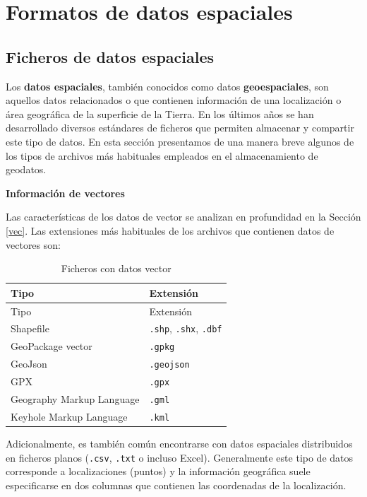 \documentclass[
]{book}
\theoremstyle{definition}
\theoremstyle{definition}
\theoremstyle{definition}
\theoremstyle{definition}
\theoremstyle{remark}
\begin{document}
\hypertarget{formatos}{%
\chapter{Formatos de datos espaciales}\label{formatos}}

\hypertarget{ficheros-de-datos-espaciales}{%
\section{Ficheros de datos espaciales}\label{ficheros-de-datos-espaciales}}

Los \textbf{datos espaciales}, también conocidos como datos \textbf{geoespaciales}, son
aquellos datos relacionados o que contienen información de una localización o
área geográfica de la superficie de la Tierra. En los últimos años se han
desarrollado diversos estándares de ficheros que permiten almacenar y compartir
este tipo de datos. En esta sección presentamos de una manera breve algunos de
los tipos de archivos más habituales empleados en el almacenamiento de geodatos.

\textbf{Información de vectores}

Las características de los datos de vector se analizan en profundidad en la
Sección \ref{vec}. Las extensiones más habituales de los archivos que contienen
datos de vectores son:

\begin{longtable}[]{@{}ll@{}}
\caption{Ficheros con datos vector}\tabularnewline
\toprule
Tipo & Extensión \\
\midrule
\endfirsthead
\toprule
Tipo & Extensión \\
\midrule
\endhead
Shapefile & \texttt{.shp}, \texttt{.shx}, \texttt{.dbf} \\
GeoPackage vector & \texttt{.gpkg} \\
GeoJson & \texttt{.geojson} \\
GPX & \texttt{.gpx} \\
Geography Markup Language & \texttt{.gml} \\
Keyhole Markup Language & \texttt{.kml} \\
\bottomrule
\end{longtable}

Adicionalmente, es también común encontrarse con datos espaciales distribuidos
en ficheros planos (\texttt{.csv}, \texttt{.txt} o incluso Excel). Generalmente este tipo de
datos corresponde a localizaciones (puntos) y la información geográfica suele
especificarse en dos columnas que contienen las coordenadas de la localización.
\end{document}
